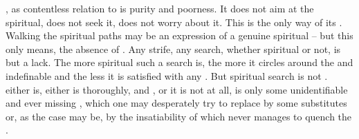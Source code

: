 
\pa\label{pa:forget}
, as contentless relation to  is purity and
poorness. It does not aim at the spiritual, does not seek it, does not
worry about it. This is the only way of its .
Walking the spiritual paths may be an expression of a genuine
spiritual  -- but this only means, the absence of
.   Any strife, any search, whether spiritual
or not, is but a lack. The more spiritual such a search is, the more
it circles around the  and indefinable  and the
less it is satisfied with any .  But spiritual search is not
.  either is, either is thoroughly,
 and , or it is not at all, is
only some unidentifiable and ever missing , which one may
desperately try to replace by some  substitutes or, as the case
may be, by the insatiability of  which never manages to quench the
. 

